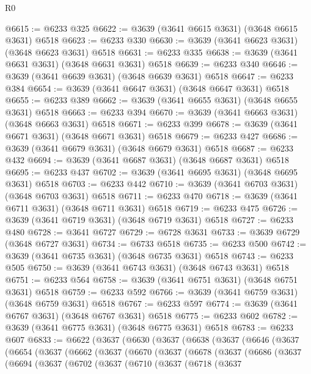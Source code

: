 \begin{lexlean}{R0}
\begin{coremodule}
@6615 := @6233 @325
@6622 := @3639 (@3641 @6615 @3631) (@3648 @6615 @3631) @6518
@6623 := @6233 @330
@6630 := @3639 (@3641 @6623 @3631) (@3648 @6623 @3631) @6518
@6631 := @6233 @335
@6638 := @3639 (@3641 @6631 @3631) (@3648 @6631 @3631) @6518
@6639 := @6233 @340
@6646 := @3639 (@3641 @6639 @3631) (@3648 @6639 @3631) @6518
@6647 := @6233 @384
@6654 := @3639 (@3641 @6647 @3631) (@3648 @6647 @3631) @6518
@6655 := @6233 @389
@6662 := @3639 (@3641 @6655 @3631) (@3648 @6655 @3631) @6518
@6663 := @6233 @394
@6670 := @3639 (@3641 @6663 @3631) (@3648 @6663 @3631) @6518
@6671 := @6233 @399
@6678 := @3639 (@3641 @6671 @3631) (@3648 @6671 @3631) @6518
@6679 := @6233 @427
@6686 := @3639 (@3641 @6679 @3631) (@3648 @6679 @3631) @6518
@6687 := @6233 @432
@6694 := @3639 (@3641 @6687 @3631) (@3648 @6687 @3631) @6518
@6695 := @6233 @437
@6702 := @3639 (@3641 @6695 @3631) (@3648 @6695 @3631) @6518
@6703 := @6233 @442
@6710 := @3639 (@3641 @6703 @3631) (@3648 @6703 @3631) @6518
@6711 := @6233 @470
@6718 := @3639 (@3641 @6711 @3631) (@3648 @6711 @3631) @6518
@6719 := @6233 @475
@6726 := @3639 (@3641 @6719 @3631) (@3648 @6719 @3631) @6518
@6727 := @6233 @480
@6728 := @3641 @6727
@6729 := @6728 @3631
@6733 := @3639 @6729 (@3648 @6727 @3631)
@6734 := @6733 @6518
@6735 := @6233 @500
@6742 := @3639 (@3641 @6735 @3631) (@3648 @6735 @3631) @6518
@6743 := @6233 @505
@6750 := @3639 (@3641 @6743 @3631) (@3648 @6743 @3631) @6518
@6751 := @6233 @564
@6758 := @3639 (@3641 @6751 @3631) (@3648 @6751 @3631) @6518
@6759 := @6233 @592
@6766 := @3639 (@3641 @6759 @3631) (@3648 @6759 @3631) @6518
@6767 := @6233 @597
@6774 := @3639 (@3641 @6767 @3631) (@3648 @6767 @3631) @6518
@6775 := @6233 @602
@6782 := @3639 (@3641 @6775 @3631) (@3648 @6775 @3631) @6518
@6783 := @6233 @607
@6833 := @6622
    (@3637
      (@6630
        (@3637
          (@6638
            (@3637
              (@6646
                (@3637
                  (@6654
                    (@3637
                      (@6662
                        (@3637
                          (@6670
                            (@3637
                              (@6678
                                (@3637
                                  (@6686
                                    (@3637
                                      (@6694
                                        (@3637
                                          (@6702
                                            (@3637
                                              (@6710
                                                (@3637
                                                  (@6718
                                                    (@3637

\end{coremodule}
\end{lexlean}
